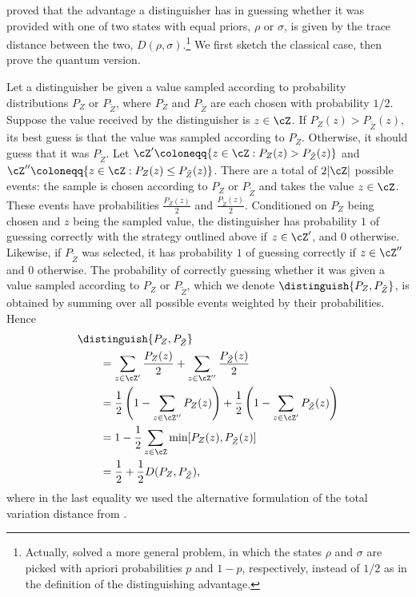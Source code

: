 \textcite{Hel76} proved that the advantage a distinguisher has in
guessing whether it was provided with one of two states with equal
priors, $\rho$ or $\sigma$, is given by the trace distance between the
two, $D(\rho,\sigma)$.\footnote{Actually, \textcite{Hel76} solved
  a more general problem, in which the states $\rho$ and $\sigma$ are
  picked with apriori probabilities $p$ and $1-p$, respectively,
  instead of $1/2$ as in the definition of the distinguishing
  advantage.} We first sketch the classical case, then prove the
quantum version.

Let a distinguisher be given a value sampled according to probability
distributions $P_Z$ or $P_{\tilde{Z}}$, where $P_Z$ and
$P_{\tilde{Z}}$ are each chosen with probability $1/2$. Suppose the
value received by the distinguisher is $z \in \cZ$. If $P_Z(z) >
P_{\tilde{Z}}(z)$, its best guess is that the value was sampled
according to $P_Z$. Otherwise, it should guess that it was
$P_{\tilde{Z}}$. Let $\cZ'\coloneqq \{z \in \cZ : P_Z(z) >
P_{\tilde{Z}}(z)\}$ and $\cZ'' \coloneqq \{z \in \cZ : P_Z(z) \leq
P_{\tilde{Z}}(z)\}$. There are a total of $2|\cZ|$ possible events:
the sample is chosen according to $P_Z$ or $P_{\tilde{Z}}$ and takes
the value $z \in \cZ$. These events have probabilities
$\frac{P_Z(z)}{2}$ and $\frac{P_{\tilde{Z}}(z)}{2}$. Conditioned on
$P_Z$ being chosen and $z$ being the sampled value, the distinguisher
has probability $1$ of guessing correctly with the strategy outlined
above if $z \in \cZ'$, and $0$ otherwise. Likewise, if $P_{\tilde{Z}}$
was selected, it has probability $1$ of guessing correctly if $z \in
\cZ''$ and $0$ otherwise. The probability of correctly guessing
whether it was given a value sampled according to $P_Z$ or
$P_{\tilde{Z}}$, which we denote $\distinguish{P_Z,P_{\tilde{Z}}}$, is
obtained by summing over all possible events weighted by their
probabilities. Hence
\begin{align*}
 &  \distinguish{P_Z,P_{\tilde{Z}}} \\
& \qquad = \sum_{z \in \cZ'} \frac{P_Z(z)}{2} + \sum_{z \in
    \cZ''} \frac{P_{\tilde{Z}}(z)}{2} \\
  & \qquad =  \frac{1}{2} \left(1- \sum_{z \in
    \cZ''} P_{Z}(z) \right) + \frac{1}{2} \left(1 - \sum_{z \in
    \cZ'} P_{\tilde{Z}}(z)\right) \\
  & \qquad = 1 - \frac{1}{2} \sum_{z \in \cZ} \min[P_Z(z), P_{\tilde{Z}}(z)] \\
  & \qquad = \frac{1}{2} + \frac{1}{2} D(P_Z,P_{\tilde{Z}}) , 
\end{align*}
where in the last equality we used the alternative formulation of the
total variation distance from .

